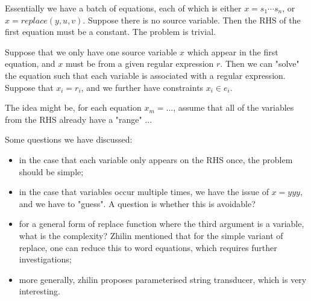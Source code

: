 \documentclass{llncs}
\begin{document}
{Essentially we have a batch of equations, each of which is either $x= s_1\cdots s_n$, or $x=replace (y, u,v)$. Suppose there is no source variable. Then the RHS of the first equation must be a constant. The problem is trivial. 

Suppose that we only have one source variable $x$ which appear in the first equation, and $x$ must be from a given regular expression $r$. Then we can "solve" the equation such that each variable is associated with a regular expression. Suppose that $x_i=r_i$, and we further have constraints $x_i\in e_i$. 

The idea might be, for each equation $x_m=...$, assume that all of the variables from the RHS already have a "range" ...

Some questions we have discussed:
\begin{itemize}
\item in the case that each variable only appears on the RHS once, the problem should be simple;

\item in the case that variables occur multiple times, we have the issue of $x=yyy$, and we have to "guess". A question is whether this is avoidable?

\item for a general form of replace function where the third argument is a variable, what is the complexity? Zhilin mentioned that for the simple variant of replace, one can reduce this to word equations, which requires further investigations;

\item more generally, zhilin proposes parameterised string transducer, which is very interesting. 
\end{itemize}
}



\end{document}
